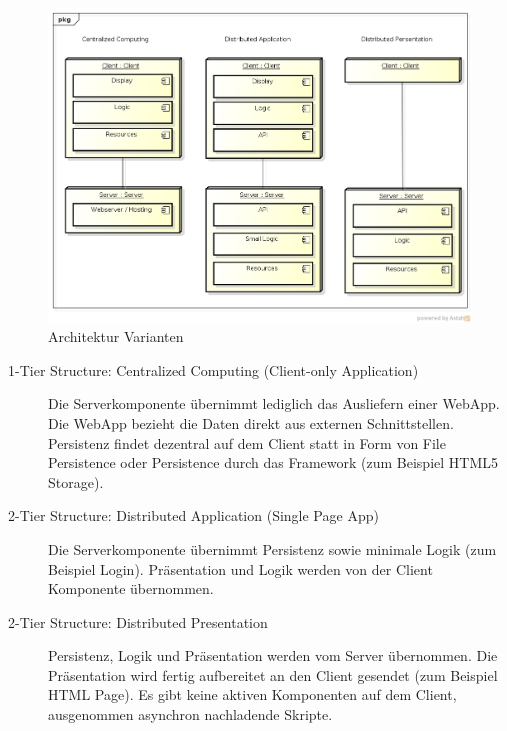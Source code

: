 		\begin{figure}[H]
			\includegraphics[width=\textwidth]{architecture/media/img/tierArchitecture.png}
			\centering
			\caption{Architektur Varianten}
			\label{fig:tierArchitecture}
		\end{figure}
		\begin{description}
			\item[1-Tier Structure: Centralized Computing (Client-only Application)]
				Die Serverkomponente übernimmt lediglich das Ausliefern einer WebApp. 
				Die WebApp bezieht die Daten direkt aus externen Schnittstellen. 
				Persistenz findet dezentral auf dem Client statt in Form von File Persistence oder 
				Persistence durch das Framework (zum Beispiel HTML5 Storage).
				
			\item[2-Tier Structure: Distributed Application (Single Page App)]
				Die Serverkomponente übernimmt Persistenz sowie minimale Logik (zum Beispiel Login).
				Präsentation und Logik werden von der Client Komponente übernommen.
				
			\item[2-Tier Structure: Distributed Presentation]
				Persistenz, Logik und Präsentation werden vom Server übernommen.
				Die Präsentation wird fertig aufbereitet an den Client gesendet (zum Beispiel HTML Page).
				Es gibt keine aktiven Komponenten auf dem Client, ausgenommen asynchron nachladende Skripte.				
		\end{description}
	
